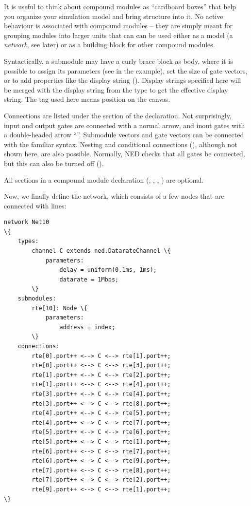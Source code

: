 It is useful to think about compound modules as ``cardboard boxes''
that help you organize your simulation model and bring structure into
it. No active behaviour is associated with compound modules -- they
are simply meant for grouping modules into larger units that can
can be used either as a model (a \textit{network}, see later)
or as a building block for other compound modules.

Syntactically, a submodule may have a curly brace block as body, where
it is possible to assign its parameters (see  in the example),
set the size of gate vectors, or to add properties like the display string
(). Display strings specified here will be merged with the
display string from the type to get the effective display string.
The  tag used here means position on the canvas.

Connections are listed under the  section of the
declaration. Not surprisingly, input and output gates are
connected with a normal arrow, and inout gates with a double-headed
arrow ``\ttt{<-->}''. Submodule vectors and gate vectors can be
connected with the familiar  syntax. Nesting and conditional
connections (), although not shown here, are also possible.
Normally, NED checks that all gates be connected, but this can also
be turned off ().

All sections in a compound module declaration (,
, , ) are optional.

Now, we finally define the network, which consists of a few nodes that
are connected with lines:

\begin{Verbatim}[commandchars=\\\{\}]
network Net10
\{
    types:
        channel C extends ned.DatarateChannel \{
            parameters:
                delay = uniform(0.1ms, 1ms);
                datarate = 1Mbps;
        \}
    submodules:
        rte[10]: Node \{
            parameters:
                address = index;
        \}
    connections:
        rte[0].port++ <--> C <--> rte[1].port++;
        rte[0].port++ <--> C <--> rte[3].port++;
        rte[1].port++ <--> C <--> rte[2].port++;
        rte[1].port++ <--> C <--> rte[4].port++;
        rte[3].port++ <--> C <--> rte[4].port++;
        rte[3].port++ <--> C <--> rte[8].port++;
        rte[4].port++ <--> C <--> rte[5].port++;
        rte[4].port++ <--> C <--> rte[7].port++;
        rte[5].port++ <--> C <--> rte[6].port++;
        rte[5].port++ <--> C <--> rte[1].port++;
        rte[6].port++ <--> C <--> rte[7].port++;
        rte[6].port++ <--> C <--> rte[9].port++;
        rte[7].port++ <--> C <--> rte[8].port++;
        rte[7].port++ <--> C <--> rte[2].port++;
        rte[9].port++ <--> C <--> rte[1].port++;
\}
\end{Verbatim}

